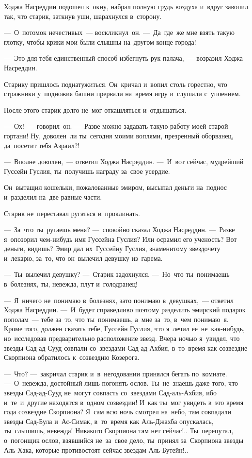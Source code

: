 \documentclass[12pt,a4paper]{book}
\begin{document}
Ходжа Насреддин подошел к~окну, набрал полную грудь воздуха и~вдруг завопил так, что старик, заткнув уши, шарахнулся в~сторону.

—~О~потомок нечестивых~— воскликнул~он. —~Да~где~же мне взять такую глотку, чтобы крики мои были слышны на~другом конце города!

—~Это для тебя единственный способ избегнуть рук палача,~— возразил Ходжа Насреддин.

Старику пришлось поднатужиться. Он~кричал и~вопил столь горестно, что стражники у~подножия башни прервали на~время игру и~слушали с~упоением.

После этого старик долго не~мог откашляться и~отдышаться.

—~Ох! —~говорил~он. —~Разве можно задавать такую работу моей старой гортани! Ну, доволен~ли ты~сегодня моими воплями, презренный оборванец, да~посетит тебя Азраил?!

—~Вполне доволен,~— ответил Ходжа Насреддин. —~И~вот сейчас, мудрейший Гуссейн Гуслия, ты~получишь награду за~свое усердие.

Он~вытащил кошельки, пожалованные эмиром, высыпал деньги на~поднос и~разделил на~две равные части.

Старик не~переставал ругаться и~проклинать.

—~За~что ты~ругаешь меня? —~спокойно сказал Ходжа Насреддин. —~Разве я~опозорил чем-нибудь имя Гуссейна Гуслия? Или осрамил его ученость? Вот деньги, видишь? Эмир дал их~Гуссейну Гуслия, знаменитому звездочету и~лекарю, за~то, что он~вылечил девушку из~гарема.

—~Ты~вылечил девушку? —~Старик задохнулся. —~Но~что ты~понимаешь в~болезнях, ты, невежда, плут и~голодранец!

—~Я~ничего не~понимаю в~болезнях, зато понимаю в~девушках,~— ответил Ходжа Насреддин. —~И~будет справедливо поэтому разделить эмирский подарок пополам~— тебе за~то, что ты~понимаешь, а~мне за~то, в~чем понимаю~я. Кроме того, должен сказать тебе, Гуссейн Гуслия, что я~лечил ее~не~как-нибудь, но~исследовав предварительно расположение звезд. Вчера ночью я~увидел, что звезды Сад-ад-Сууд совпали со~звездами Сад-ад-Ахбия, в~то~время как созвездие Скорпиона обратилось к~созвездию Козерога.

—~Что? —~закричал старик и~в~негодовании принялся бегать по~комнате. —~О~невежда, достойный лишь погонять ослов. Ты~не~знаешь даже того, что звезды Сад-ад-Сууд не~могут совпасть со~звездами Сад-аль-Ахбия, ибо и~те~и~другие находятся в~одном созвездии! И~как ты~мог увидеть в~это время года созвездие Скорпиона? Я~сам всю ночь смотрел на~небо, там совпадали звезды Сад-Була и~Ас-Симак, в~то~время как Аль-Джахба опускалась, ты~слышишь, невежда! Никакого Скорпиона там нет сейчас!.. Ты~перепутал, о~погонщик ослов, взявшийся не~за~свое дело, ты~принял за~Скорпиона звезды Аль-Хака, которые противостоят сейчас звездам Аль-Бутейн!..
\end{document}
